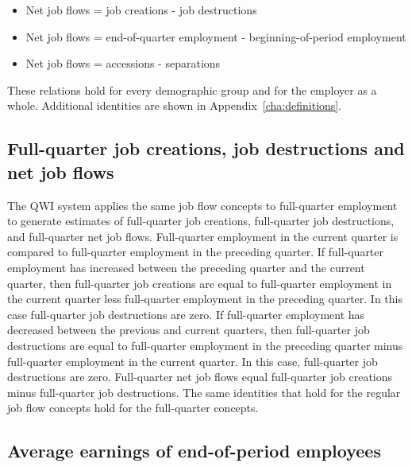 \begin{itemize}
\item Net job flows = job creations - job destructions 
%
%

\item Net job flows = end-of-quarter employment - beginning-of-period
employment 
%

\item Net job flows = accessions - separations 
\end{itemize}

These relations hold for every demographic group and for the employer as a
whole. Additional identities are shown in Appendix~\ref{cha:definitions}.

\subsection{Full-quarter job creations, job destructions and net job flows}


The QWI system applies the same job flow concepts to full-quarter employment
to generate estimates of full-quarter job creations, full-quarter job
destructions, and full-quarter net job flows. Full-quarter employment in the
current quarter is compared to full-quarter employment in the preceding
quarter. If full-quarter employment has increased between the preceding
quarter and the current quarter, then full-quarter job creations are equal
to full-quarter employment in the current quarter less full-quarter
employment in the preceding quarter. In this case full-quarter job
destructions are zero. If full-quarter employment has decreased between the
previous and current quarters, then full-quarter job destructions are equal
to full-quarter employment in the preceding quarter minus full-quarter
employment in the current quarter. In this case, full-quarter job
destructions are zero. Full-quarter net job flows equal full-quarter job
creations minus full-quarter job destructions. The same identities that hold
for the regular job flow concepts hold for the full-quarter concepts.

\subsection{Average earnings of end-of-period employees}

